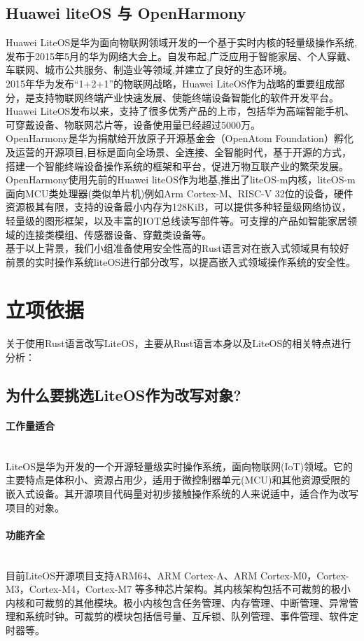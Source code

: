 \documentclass{ctexart}
\begin{document}
\subsection{Huawei liteOS 与 OpenHarmony}
Huawei LiteOS是华为面向物联网领域开发的一个基于实时内核的轻量级操作系统,发布于2015年5月的华为网络大会上。自发布起,广泛应用于智能家居、个人穿戴、车联网、城市公共服务、制造业等领域,并建立了良好的生态环境。\\
\indent 2015年华为发布“1+2+1”的物联网战略，Huawei LiteOS作为战略的重要组成部分，是支持物联网终端产业快速发展、使能终端设备智能化的软件开发平台。Huawei LiteOS发布以来，支持了很多优秀产品的上市，包括华为高端智能手机、可穿戴设备、物联网芯片等，设备使用量已经超过5000万。\\
\indent OpenHarmony是华为捐献给开放原子开源基金会（OpenAtom Foundation）孵化及运营的开源项目,目标是面向全场景、全连接、全智能时代，基于开源的方式，搭建一个智能终端设备操作系统的框架和平台，促进万物互联产业的繁荣发展。\\
\indent OpenHarmony使用先前的Huawei liteOS作为地基,推出了liteOS-m内核，liteOS-m面向MCU类处理器(类似单片机)例如Arm Cortex-M、RISC-V 32位的设备，硬件资源极其有限，支持的设备最小内存为128KiB，可以提供多种轻量级网络协议，轻量级的图形框架，以及丰富的IOT总线读写部件等。可支撑的产品如智能家居领域的连接类模组、传感器设备、穿戴类设备等。\\
\indent 基于以上背景，我们小组准备使用安全性高的Rust语言对在嵌入式领域具有较好前景的实时操作系统liteOS进行部分改写，以提高嵌入式领域操作系统的安全性。

\section{立项依据}

关于使用Rust语言改写LiteOS，主要从Rust语言本身以及LiteOS的相关特点进行分析：
\subsection{为什么要挑选LiteOS作为改写对象?}

\paragraph{工作量适合}  \ \\
\indent LiteOS是华为开发的一个开源轻量级实时操作系统，面向物联网(IoT)领域。它的主要特点是体积小、资源占用少，适用于微控制器单元(MCU)和其他资源受限的嵌入式设备。其开源项目代码量对初步接触操作系统的人来说适中，适合作为改写项目的对象。
\paragraph{功能齐全} \ \\
\indent 目前LiteOS开源项目支持ARM64、ARM Cortex-A、ARM Cortex-M0，Cortex-M3，Cortex-M4，Cortex-M7 等多种芯片架构。其内核架构包括不可裁剪的极小内核和可裁剪的其他模块。极小内核包含任务管理、内存管理、中断管理、异常管理和系统时钟。可裁剪的模块包括信号量、互斥锁、队列管理、事件管理、软件定时器等。
\end{document}
